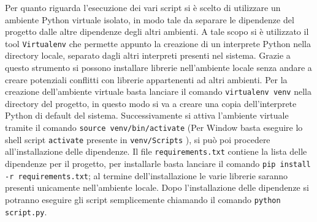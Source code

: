 Per quanto riguarda l’esecuzione dei vari script si è scelto di utilizzare un ambiente Python virtuale isolato, in modo tale da separare le dipendenze del progetto dalle altre dipendenze degli altri ambienti. A tale scopo si è utilizzato il tool \texttt{Virtualenv} che permette appunto la creazione di un interprete Python nella directory locale, separato dagli altri interpreti presenti nel sistema. Grazie a questo strumento si possono installare librerie nell’ambiente locale senza andare a creare potenziali conflitti con librerie appartenenti ad altri ambienti. Per la creazione dell’ambiente virtuale basta lanciare il comando \texttt{virtualenv venv} nella directory del progetto, in questo modo si va a creare una copia dell’interprete Python di default del sistema. Successivamente si attiva l’ambiente virtuale tramite il comando \texttt{source venv/bin/activate} (Per Window basta eseguire lo shell script \texttt{activate} presente in \texttt{venv/Scripts} ), si può poi procedere all’installazione delle dipendenze. Il file \texttt{requirements.txt} contiene la lista delle dipendenze per il progetto, per installarle basta lanciare il comando \texttt{pip install -r requirements.txt}; al termine dell’installazione le varie librerie saranno presenti unicamente nell’ambiente locale. Dopo l’installazione delle dipendenze si potranno eseguire gli script semplicemente chiamando il comando \texttt{python script.py}.
